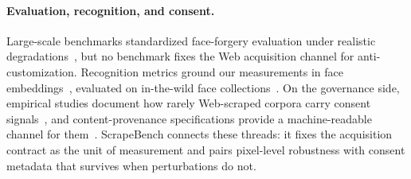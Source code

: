 \paragraph{Evaluation, recognition, and consent.}
Large-scale benchmarks standardized face-forgery evaluation under realistic
degradations~\cite{bei2024largescale,pei2024deepfake}, but no benchmark fixes
the Web acquisition channel for anti-customization. Recognition metrics
ground our measurements in face embeddings~\cite{deng2018arcface}, evaluated
on in-the-wild face collections~\cite{liu2015deep}. On the governance side,
empirical studies document how rarely Web-scraped corpora carry consent
signals~\cite{lee2025data}, and content-provenance specifications provide a
machine-readable channel for them~\cite{c2pa2026spec}. ScrapeBench connects
these threads: it fixes the acquisition contract as the unit of measurement
and pairs pixel-level robustness with consent metadata that survives when
perturbations do not.
